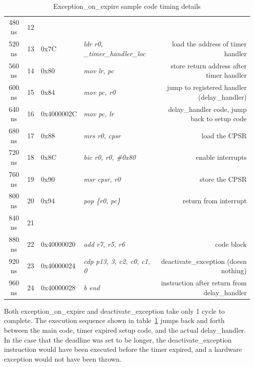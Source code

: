 \begin{table}
\begin{center}
{\begin{tabular}{ | c | c | l | l r | }
  480 ns & 12 & & & \\
  520 ns & 13 & 0x7C & \textit{ldr   r0, \_timer\_handler\_loc} & load the address of timer handler \\
  560 ns & 14 & 0x80 & \textit{mov   lr, pc} & store return address after timer handler \\
  600 ns & 15 & 0x84 & \textit{mov   pc, r0} & jump to registered handler (delay\_handler) \\
  640 ns & 16 & 0x4000002C & \textit{mov   pc, lr} & delay\_handler code, jump back to setup code\\  
  680 ns & 17 & 0x88 & \textit{mrs   r0, cpsr} & load the CPSR\\
  720 ns & 18 & 0x8C & \textit{bic   r0, r0, \#0x80} &  enable interrupts\\
  760 ns & 19 & 0x90 & \textit{msr   cpsr, r0} &  store the CPSR\\
  800 ns & 20 & 0x94 & \textit{pop   \{r0, pc\}} & return from interrupt\\
  840 ns & 21 & & & \\    
  880 ns & 22 & 0x40000020 & \textit{add r7, r5, r6} & code block\\
  920 ns & 23 & 0x40000024 & \textit{cdp p13, 3, c2, c0, c1, 0} & deactivate\_exception (doesn nothing) \\
  960 ns & 24 & 0x40000028 & \textit{b end} & instruction after return from delay\_handler\\
  \hline 
\end{tabular}}
\end{center}
\caption{Exception\_on\_expire sample code timing details}
\label{exception-expire-timing}
\end{table}

Both exception\_on\_expire and deactivate\_exception take only 1 cycle to complete.
The execution sequence shown in table~\ref{exception-expire-timing} jumps back and forth between the main code, timer expired setup code, and the actual delay\_handler. 
In the case that the deadline was set to be longer, the deactivate\_exception instruction would have been executed before the timer expired, and a hardware exception would not have been thrown.









